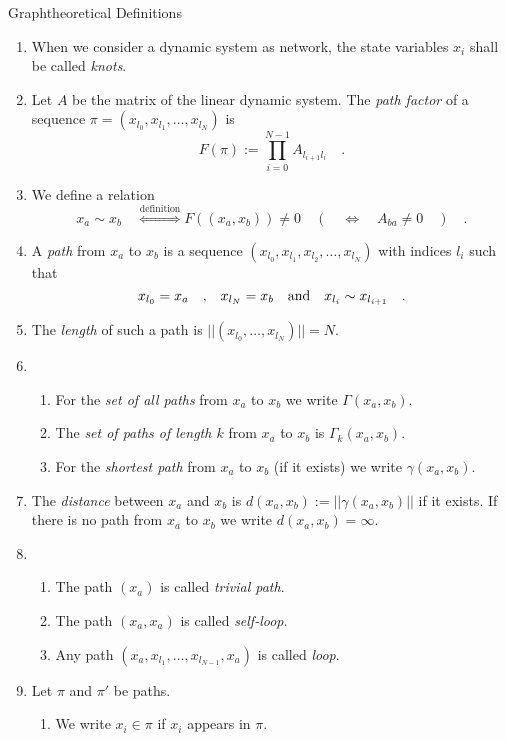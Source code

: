 \begin{definition}{Graphtheoretical Definitions}{}
\begin{enumerate}
	\item
	When we consider a dynamic system as network, the state variables $x_i$ shall be called 
	\textit{knots}.
	\item	
	Let $A$ be the matrix of the linear dynamic system. The \textit{path factor} of a 
	sequence $\pi=(x_{l_0},x_{l_1},\ldots,x_{l_N})$ is
	\begin{equation}
		F(\pi):=\prod\limits_{i=0}^{N-1} A_{l_{i+1}l_i} \quad . 
	\end{equation}
	\item
	We define a relation
	\begin{equation}
	x_a \sim x_b \quad \overset{ { \text{definition} } }{ \Longleftrightarrow } 
	F( (x_a,x_b) )\neq 0  \quad \left( \quad \Longleftrightarrow \quad A_{ba} \neq 0 \quad 
	\right)\quad .
	\end{equation}
	\item
	A \textit{path} from $x_a$ to $x_b$ is a sequence $(x_{l_0},x_{l_1},x_{l_2},
	\ldots,x_{l_N})$ with indices $l_i$ such that 
	\begin{equation}
	x_{l_0} = x_a \quad \text{,} \quad x_{l_N} = x_b \quad \text{and} \quad x_{l_i} \sim x_{l_{i+1}}	\quad .
	\end{equation}
	\item
	The \textit{length} of such a path is $||(x_{l_0},\ldots, x_{l_N} )||=N$. 
	\item	
	\begin{enumerate}
	\item
	For the \textit{set of all paths} from $x_a$ to $x_b$ we write $\Gamma(x_a,x_b)$.
	\item
	The \textit{set of paths of length $k$} from $x_a$ to $x_b$ is $\Gamma_k(x_a,x_b)$.
	\item
	For the \textit{shortest path} from $x_a$ to $x_b$ (if it exists) we write 
	$\gamma(x_a,x_b)$.
	\end{enumerate}
	\item
	The \textit{distance} between $x_a$ and $x_b$ is $d(x_a,x_b):=||\gamma(x_a,x_b)||$ if 	
	it exists. If there is no path from $x_a$ to $x_b$ we write $d(x_a,x_b)=\infty$.
	\item
	 \begin{enumerate}
	\item		
	The path $(x_a)$ is called \textit{trivial path}. 
	\item	
	The path $(x_a,x_a)$ is called \textit{self-loop}. 
	\item	
	Any path $(x_a,x_{l_1},\ldots,x_{l_{N-1}},x_a)$ is called 
	\textit{loop}. 
	\end{enumerate}
	\item	
	Let $\pi$ and $\pi'$ be paths. 
	\begin{enumerate} \item
	We write $x_i\in\pi$ if $x_i$ appears in $\pi$.
	\end{enumerate}
\end{enumerate}	
\end{definition}


